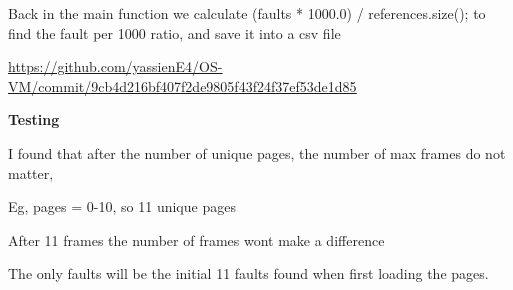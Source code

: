 Back in the main function we calculate (faults * 1000.0) /
references.size(); to find the fault per 1000 ratio, and save it into a
csv file

\href{https://github.com/yassienE4/OS-VM/commit/9cb4d216bf407f2de9805f43f24f37ef53de1d85}{\ul{https://github.com/yassienE4/OS-VM/commit/9cb4d216bf407f2de9805f43f24f37ef53de1d85}}

\textbf{Testing}

I found that after the number of unique pages, the number of max frames
do not matter,

Eg, pages = 0-10, so 11 unique pages

After 11 frames the number of frames wont make a difference

The only faults will be the initial 11 faults found when first loading
the pages.
